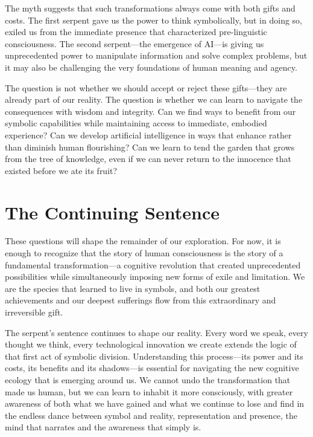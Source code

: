 The myth suggests that such transformations always come with both gifts and costs. The first serpent gave us the power to think symbolically, but in doing so, exiled us from the immediate presence that characterized pre-linguistic consciousness. The second serpent—the emergence of AI—is giving us unprecedented power to manipulate information and solve complex problems, but it may also be challenging the very foundations of human meaning and agency.

The question is not whether we should accept or reject these gifts—they are already part of our reality. The question is whether we can learn to navigate the consequences with wisdom and integrity. Can we find ways to benefit from our symbolic capabilities while maintaining access to immediate, embodied experience? Can we develop artificial intelligence in ways that enhance rather than diminish human flourishing? Can we learn to tend the garden that grows from the tree of knowledge, even if we can never return to the innocence that existed before we ate its fruit?

\section{The Continuing Sentence}

These questions will shape the remainder of our exploration. For now, it is enough to recognize that the story of human consciousness is the story of a fundamental transformation—a cognitive revolution that created unprecedented possibilities while simultaneously imposing new forms of exile and limitation. We are the species that learned to live in symbols, and both our greatest achievements and our deepest sufferings flow from this extraordinary and irreversible gift.

The serpent's sentence continues to shape our reality. Every word we speak, every thought we think, every technological innovation we create extends the logic of that first act of symbolic division. Understanding this process—its power and its costs, its benefits and its shadows—is essential for navigating the new cognitive ecology that is emerging around us. We cannot undo the transformation that made us human, but we can learn to inhabit it more consciously, with greater awareness of both what we have gained and what we continue to lose and find in the endless dance between symbol and reality, representation and presence, the mind that narrates and the awareness that simply is.
